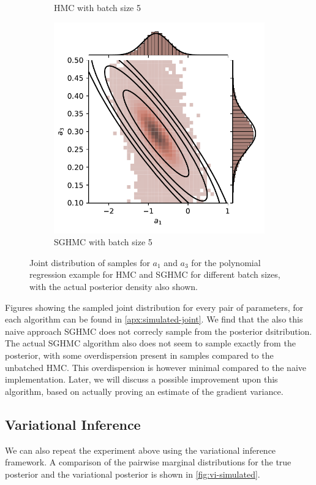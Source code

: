 \begin{figure}[htbp]
\begin{subfigure}[b]{0.45\linewidth}
        \caption{HMC with batch size 5}
    \end{subfigure}
    \begin{subfigure}[b]{0.45\linewidth}
        \centering
        \includegraphics[width=\linewidth]{Figures/simulated_joint_SGHMC_5.pdf} 
        \caption{SGHMC with batch size 5}
    \end{subfigure}
    \caption{Joint distribution of samples for $a_1$ and $a_3$ for the polynomial regression example for HMC and SGHMC for different batch sizes, with the actual posterior density also shown.}
    \label{fig:simulated_joint_comp}
\end{figure}
Figures showing the sampled joint distribution for every pair of parameters, for each algorithm can be found in \cref{apx:simulated-joint}.
We find that the also this naive approach SGHMC does not correcly sample from the posterior dsitribution.
The actual SGHMC algorithm also does not seem to sample exactly from the posterior, with some overdispersion present in samples compared to the unbatched HMC. 
This overdispersion is however minimal compared to the naive implementation.
Later, we will discuss a possible improvement upon this algorithm, based on actually proving an estimate of the gradient variance.

\subsection{Variational Inference} 
We can also repeat the experiment above using the variational inference framework.
A comparison of the pairwise marginal distributions for the true posterior and the variational posterior is shown in \cref{fig:vi-simulated}. 

